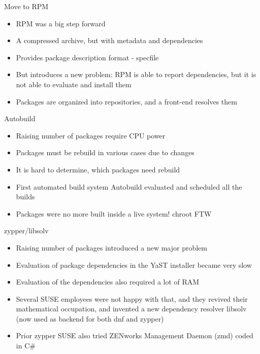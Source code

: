 \documentclass{beamer}
\begin{document}
\begin{frame}[t]{Move to RPM}
	\begin{itemize}
	\item RPM was a big step forward
	\item A compressed archive, but with metadata and dependencies
	\item Provides package description format - specfile
	\item But introduces a new problem: RPM is able to report dependencies, but it is not able to evaluate and install them
	\item Packages are organized into repositories, and a front-end resolves them
	\end{itemize}
\end{frame}

\begin{frame}[t]{Autobuild}
	\begin{itemize}
	\item Raising number of packages require CPU power
	\item Packages must be rebuild in various cases due to changes
	\item It is hard to determine, which packages need rebuild
	\item First automated build system Autobuild evaluated and scheduled all the builds
	\item Packages were no more built inside a live system! chroot FTW
	\end{itemize}
\end{frame}

\begin{frame}[t]{zypper/libsolv}
        \begin{itemize}
        \item Raising number of packages introduced a new major problem
        \item Evaluation of package dependencies in the YaST installer became very slow
        \item Evaluation of the dependencies also required a lot of RAM
        \item Several SUSE employees were not happy with that, and they revived their mathematical occupation, and invented a new dependency resolver libsolv (now used as backend for both dnf and zypper)
        \item Prior zypper SUSE also tried ZENworks Management Daemon (zmd) coded in C\#
        \end{itemize}
\end{frame}
\end{document}
